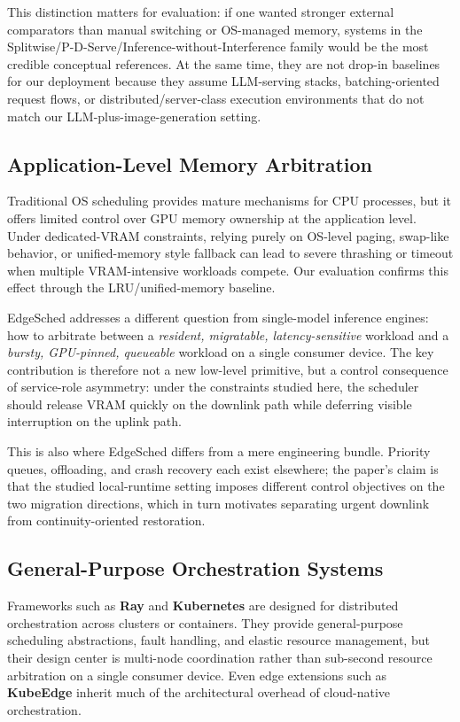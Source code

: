 This distinction matters for evaluation: if one wanted stronger external comparators than manual switching or OS-managed memory, systems in the Splitwise/P-D-Serve/Inference-without-Interference family would be the most credible conceptual references. At the same time, they are not drop-in baselines for our deployment because they assume LLM-serving stacks, batching-oriented request flows, or distributed/server-class execution environments that do not match our LLM-plus-image-generation setting.

\subsection{Application-Level Memory Arbitration}

Traditional OS scheduling provides mature mechanisms for CPU processes, but it offers limited control over GPU memory ownership at the application level. Under dedicated-VRAM constraints, relying purely on OS-level paging, swap-like behavior, or unified-memory style fallback can lead to severe thrashing or timeout when multiple VRAM-intensive workloads compete. Our evaluation confirms this effect through the LRU/unified-memory baseline.

EdgeSched addresses a different question from single-model inference engines: how to arbitrate between a \emph{resident, migratable, latency-sensitive} workload and a \emph{bursty, GPU-pinned, queueable} workload on a single consumer device. The key contribution is therefore not a new low-level primitive, but a control consequence of service-role asymmetry: under the constraints studied here, the scheduler should release VRAM quickly on the downlink path while deferring visible interruption on the uplink path.

This is also where EdgeSched differs from a mere engineering bundle. Priority queues, offloading, and crash recovery each exist elsewhere; the paper's claim is that the studied local-runtime setting imposes different control objectives on the two migration directions, which in turn motivates separating urgent downlink from continuity-oriented restoration.

\subsection{General-Purpose Orchestration Systems}

Frameworks such as \textbf{Ray}\cite{moritz2018ray} and \textbf{Kubernetes}\cite{verma2015borg} are designed for distributed orchestration across clusters or containers. They provide general-purpose scheduling abstractions, fault handling, and elastic resource management, but their design center is multi-node coordination rather than sub-second resource arbitration on a single consumer device. Even edge extensions such as \textbf{KubeEdge}\cite{xiong2019kubeedge} inherit much of the architectural overhead of cloud-native orchestration.

